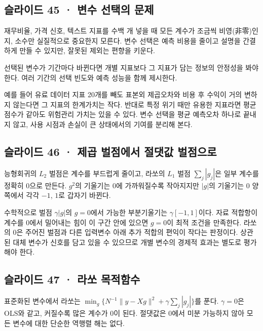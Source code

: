 \documentclass[11pt,a4paper]{article}
\begin{document}
\subsection{슬라이드 45 · 변수 선택의 문제}
재무비율, 가격 신호, 텍스트 지표를 수백 개 넣을 때 모든 계수가 조금씩 비영(非零)인지, 소수만 실질적으로 중요한지 모른다. 변수 선택은 예측 비용을 줄이고 설명을 간결하게 만들 수 있지만, 잘못된 제외는 편향을 키운다.\par

선택된 변수가 기간마다 바뀐다면 개별 지표보다 그 지표가 담는 정보의 안정성을 봐야 한다. 여러 기간의 선택 빈도와 예측 성능을 함께 제시한다.\par

예를 들어 유료 데이터 지표 20개를 빼도 표본외 제곱오차와 비용 후 수익이 거의 변하지 않는다면 그 지표의 한계가치는 작다. 반대로 특정 위기 때만 유용한 지표라면 평균 점수가 같아도 위험관리 가치는 있을 수 있다. 변수 선택을 평균 예측오차 하나로 끝내지 않고, 사용 시점과 손실이 큰 상태에서의 기여를 분리해 본다.\par

\subsection{슬라이드 46 · 제곱 벌점에서 절댓값 벌점으로}
능형회귀의 $L_2$ 벌점은 계수를 부드럽게 줄이고, 라쏘의 $L_1$ 벌점 $\sum_j|g_j|$은 일부 계수를 정확히 0으로 만든다. $g^2$의 기울기는 0에 가까워질수록 작아지지만 $|g|$의 기울기는 0 양쪽에서 각각 $-1$, $1$로 갑자기 바뀐다.\par

수학적으로 벌점 $\gamma|g|$의 $g=0$에서 가능한 부분기울기는 $\gamma[-1,1]$이다. 자료 적합항이 계수를 0에서 밀어내는 힘이 이 구간 안에 있으면 $g=0$이 최적 조건을 만족한다. 라쏘의 0은 주어진 벌점과 다른 입력변수 아래 추가 적합의 편익이 작다는 판정이다. 상관된 대체 변수가 신호를 담고 있을 수 있으므로 개별 변수의 경제적 효과는 별도로 평가해야 한다.\par

\subsection{슬라이드 47 · 라쏘 목적함수}
표준화된 변수에서 라쏘는 $\min_g\{N^{-1}\|y-Xg\|^2+\gamma\sum_j|g_j|\}$를 푼다. $\gamma=0$은 OLS와 같고, 커질수록 많은 계수가 0이 된다. 절댓값은 0에서 미분 가능하지 않아 모든 변수에 대한 단순한 역행렬 해는 없다.\par
\end{document}
